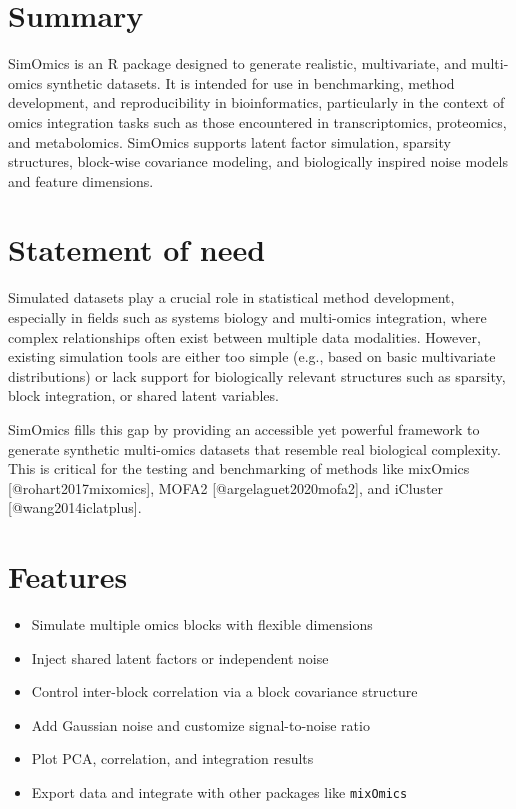 \section{Summary}\label{summary}

SimOmics is an R package designed to generate realistic, multivariate,
and multi-omics synthetic datasets. It is intended for use in
benchmarking, method development, and reproducibility in bioinformatics,
particularly in the context of omics integration tasks such as those
encountered in transcriptomics, proteomics, and metabolomics. SimOmics
supports latent factor simulation, sparsity structures, block-wise
covariance modeling, and biologically inspired noise models and feature
dimensions.

\section{Statement of need}\label{statement-of-need}

Simulated datasets play a crucial role in statistical method
development, especially in fields such as systems biology and
multi-omics integration, where complex relationships often exist between
multiple data modalities. However, existing simulation tools are either
too simple (e.g., based on basic multivariate distributions) or lack
support for biologically relevant structures such as sparsity, block
integration, or shared latent variables.

SimOmics fills this gap by providing an accessible yet powerful
framework to generate synthetic multi-omics datasets that resemble real
biological complexity. This is critical for the testing and benchmarking
of methods like mixOmics {[}@rohart2017mixomics{]}, MOFA2
{[}@argelaguet2020mofa2{]}, and iCluster {[}@wang2014iclatplus{]}.

\section{Features}\label{features}

\begin{itemize}
\tightlist
\item
  Simulate multiple omics blocks with flexible dimensions
\item
  Inject shared latent factors or independent noise
\item
  Control inter-block correlation via a block covariance structure
\item
  Add Gaussian noise and customize signal-to-noise ratio
\item
  Plot PCA, correlation, and integration results
\item
  Export data and integrate with other packages like \texttt{mixOmics}
\end{itemize}

